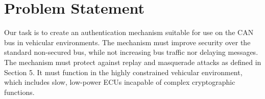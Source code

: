 \section{Problem Statement}
\label{problem}

Our task is to create an authentication mechanism suitable for use on the CAN bus in vehicular environments. 
The mechanism must improve security over the standard non-secured bus, while 
not increasing bus traffic nor delaying messages.
The mechanism must protect against replay and masquerade attacks as defined in Section 5.
It must function in the highly constrained vehicular environment,
which includes slow, low-power ECUs incapable of complex cryptographic functions.



